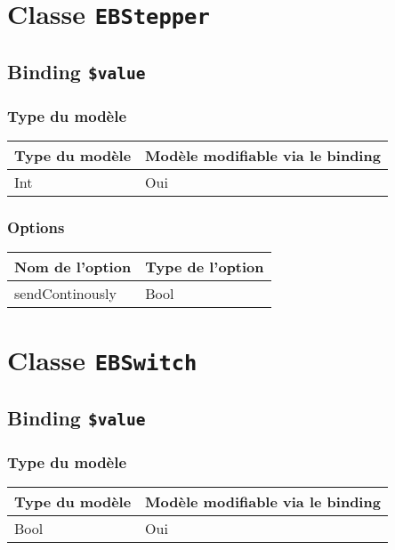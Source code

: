 \section{Classe \texttt{EBStepper}}

\subsection{Binding \texttt{\$value}}

\subsubsection{Type du modèle}

\begin{tabular}{|l|l|}
\hline
\textbf{Type du modèle} & \textbf{Modèle modifiable via le binding}\\
\hline
Int & Oui\\
\hline
\end{tabular}
\subsubsection{Options}

\begin{tabular}{|l|l|}
\hline
\textbf{Nom de l'option} & \textbf{Type de l'option}\\
\hline
sendContinously & Bool\\
\hline
\end{tabular}







\section{Classe \texttt{EBSwitch}}

\subsection{Binding \texttt{\$value}}

\subsubsection{Type du modèle}

\begin{tabular}{|l|l|}
\hline
\textbf{Type du modèle} & \textbf{Modèle modifiable via le binding}\\
\hline
Bool & Oui\\
\hline
\end{tabular}
